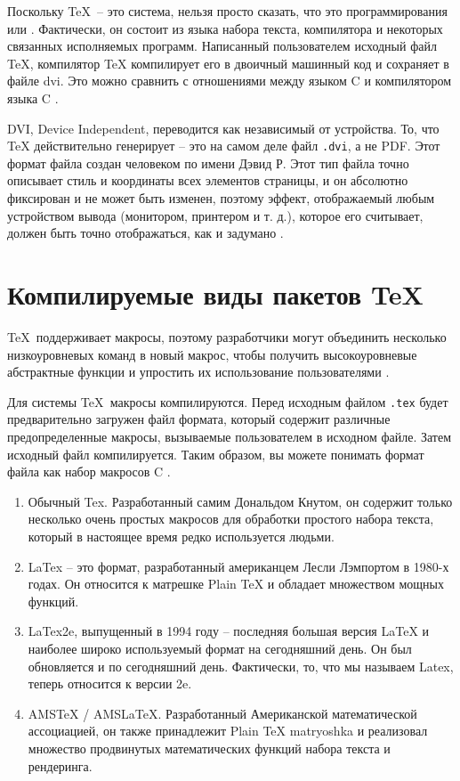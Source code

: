 Поскольку \TeX  \verb| |-- это система, нельзя просто сказать, что это  программирования\guillemotright \verb| | или \guillemotright. Фактически, он состоит из языка набора текста, компилятора и некоторых связанных исполняемых программ. Написанный пользователем исходный файл TeX, компилятор TeX компилирует его в двоичный машинный код и сохраняет в файле dvi. Это можно сравнить с отношениями между языком C и компилятором языка C \cite{20}.

DVI, Device Independent, переводится как независимый от устройства. То, что TeX действительно генерирует -- это на самом деле файл \verb|.dvi|, а не PDF. Этот формат файла создан человеком по имени Дэвид Р. Этот тип файла точно описывает стиль и координаты всех элементов страницы, и он абсолютно фиксирован и не может быть изменен, поэтому эффект, отображаемый любым устройством вывода (монитором, принтером и т. д.), которое его считывает, должен быть точно отображаться, как и задумано \cite{17}.

\section{Компилируемые виды пакетов \TeX}

\TeX \verb| |поддерживает макросы, поэтому разработчики могут объединить несколько низкоуровневых команд в новый макрос, чтобы получить высокоуровневые абстрактные функции и упростить их использование пользователями \cite{23}.

Для системы \TeX \verb| |макросы компилируются. Перед исходным файлом \verb|.tex| будет предварительно загружен файл формата, который содержит различные предопределенные макросы, вызываемые пользователем в исходном файле. Затем исходный файл компилируется. Таким образом, вы можете понимать формат файла как набор макросов C \cite{21}.

\begin{enumerate}
    \item  Обычный Tex. Разработанный самим Дональдом Кнутом, он содержит только несколько очень простых макросов для обработки простого набора текста, который в настоящее время редко используется людьми.
    
    \item LaTex -- это формат, разработанный американцем Лесли Лэмпортом в 1980-х годах. Он относится к матрешке Plain TeX и обладает множеством мощных функций.
    
    \item LaTex2e, выпущенный в 1994 году -- последняя большая версия LaTeX и наиболее широко используемый формат на сегодняшний день. Он был обновляется и по сегодняшний день. Фактически, то, что мы называем \guillemotleft Latex\guillemotright, теперь относится к версии 2e.
    
    \item AMSTeX / AMSLaTeX. Разработанный Американской математической ассоциацией, он также принадлежит Plain TeX matryoshka и реализовал множество продвинутых математических функций набора текста и рендеринга.
    
\end{enumerate}


